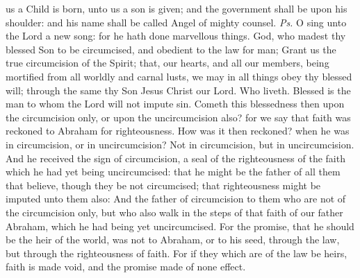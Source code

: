 
\introit
{} us a Child is born, unto us a son is given; and the government shall be upon his shoulder: and his name shall be called Angel of mighty counsel. \textit{Ps.} O sing unto the Lord a new song: for he hath done marvellous things.
\collect
{} God, who madest thy blessed Son to be circumcised, and obedient to the law for man; Grant us the true circumcision of the Spirit; that, our hearts, and all our members, being mortified from all worldly and carnal lusts, we may in all things obey thy blessed will; through the same thy Son Jesus Christ our Lord. Who liveth.
 Blessed is the man to whom the Lord will not impute sin. Cometh this blessedness then upon the circumcision only, or upon the uncircumcision also? for we say that faith was reckoned to Abraham for righteousness. How was it then reckoned? when he was in circumcision, or in uncircumcision? Not in circumcision, but in uncircumcision. And he received the sign of circumcision, a seal of the righteousness of the faith which he had yet being uncircumcised: that he might be the father of all them that believe, though they be not circumcised; that righteousness might be imputed unto them also: And the father of circumcision to them who are not of the circumcision only, but who also walk in the steps of that faith of our father Abraham, which he had being yet uncircumcised. For the promise, that he should be the heir of the world, was not to Abraham, or to his seed, through the law, but through the righteousness of faith. For if they which are of the law be heirs, faith is made void, and the promise made of none effect.


\vspace{-0.3\baselineskip}


\vspace{-0.03\baselineskip}

